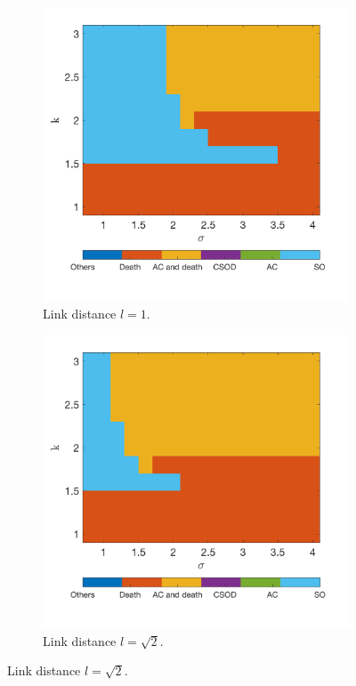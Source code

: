 \documentclass[12pt]{article}
\begin{document}
\begin{figure}[h]
    \centering
    \begin{subfigure}[b]{0.4\linewidth}
    \centering
    \includegraphics[width=\textwidth]{Xinzhu Section/2dlat16_1.png}
    \caption{Link distance $l=1$.}
    \end{subfigure}
    \hfill
    \begin{subfigure}[b]{0.4\linewidth}
    \centering
    \includegraphics[width=\textwidth]{Xinzhu Section/2dlat16_sqrt(2).png}
    \caption{Link distance $l=\sqrt{2}$.}
    \end{subfigure}
    \label{fig:a link distances and parameter searches}

\end{figure}
\end{document}
